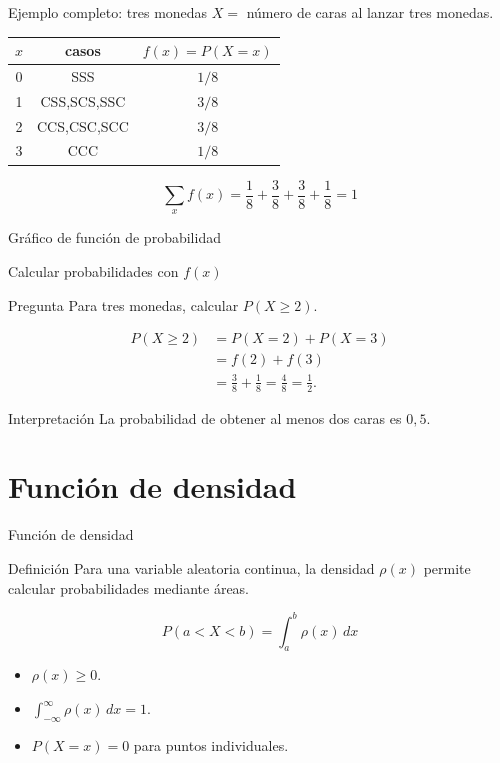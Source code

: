 \documentclass[aspectratio=169,11pt]{beamer}
\begin{document}
\begin{frame}{Ejemplo completo: tres monedas}
\small
$X=$ número de caras al lanzar tres monedas.
\begin{center}
\begin{tabular}{c c c}
\toprule
$x$ & casos & $f(x)=P(X=x)$ \\
\midrule
0 & SSS & $1/8$ \\
1 & CSS,SCS,SSC & $3/8$ \\
2 & CCS,CSC,SCC & $3/8$ \\
3 & CCC & $1/8$ \\
\bottomrule
\end{tabular}
\end{center}
\[
\sum_x f(x)=\frac18+\frac38+\frac38+\frac18=1
\]
\end{frame}

\begin{frame}{Gráfico de función de probabilidad}
\centering
{}
\end{frame}

\begin{frame}{Calcular probabilidades con $f(x)$}
\begin{block}{Pregunta}
Para tres monedas, calcular $P(X\ge2)$.
\end{block}
\pause
\begin{align*}
P(X\ge2)&=P(X=2)+P(X=3)\\
&=f(2)+f(3)\\
&=\frac38+\frac18=\frac48=\frac12.
\end{align*}
\begin{exampleblock}{Interpretación}
La probabilidad de obtener al menos dos caras es $0{,}5$.
\end{exampleblock}
\end{frame}

\section{Función de densidad}

\begin{frame}{Función de densidad}
\begin{block}{Definición}
Para una variable aleatoria continua, la densidad $\rho(x)$ permite calcular probabilidades mediante áreas.
\end{block}
\[
P(a<X<b)=\int_a^b \rho(x)\,dx
\]
\begin{itemize}
  \item $\rho(x)\ge0$.
  \item $\int_{-\infty}^{\infty}\rho(x)\,dx=1$.
  \item $P(X=x)=0$ para puntos individuales.
\end{itemize}
\end{frame}
\end{document}

